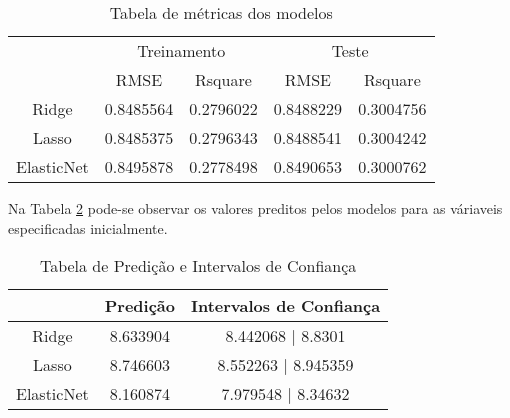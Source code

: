 \begin{table}[H]
\centering
\caption{Tabela de métricas dos modelos}
\begin{tabular}{c|c|c|c|c||}      
\cline{2-5}
    & \multicolumn{2}{c|}{Treinamento} & \multicolumn{2}{c||}{Teste}\\
\cline{2-5}
    & RMSE & Rsquare & RMSE & Rsquare\\
\cline{1-5}
\multicolumn{1}{||c|}{Ridge} & \cellcolor[HTML]{FFF8B8} 0.8485564 & \cellcolor[HTML]{FFF8B8} 0.2796022 & \cellcolor[HTML]{CAF2C2} 0.8488229 & \cellcolor[HTML]{CAF2C2} 0.3004756 \\
\cline{1-5}
\multicolumn{1}{||c|}{Lasso} & \cellcolor[HTML]{CAF2C2} 0.8485375 & \cellcolor[HTML]{CAF2C2} 0.2796343 & \cellcolor[HTML]{FFF8B8} 0.8488541 & \cellcolor[HTML]{FFF8B8} 0.3004242 \\
\cline{1-5}
\multicolumn{1}{||c|}{ElasticNet} & \cellcolor[HTML]{FFD6C9} 0.8495878 & \cellcolor[HTML]{FFD6C9} 0.2778498 & \cellcolor[HTML]{FFD6C9} 0.8490653 & \cellcolor[HTML]{FFD6C9} 0.3000762 \\                
\hline
\end{tabular}
\label{tab:metricas}
\end{table}

Na Tabela \ref{tab:predicao} pode-se observar os valores preditos pelos modelos para as váriaveis especificadas inicialmente.

\begin{table}[H]
\centering
\caption{Tabela de Predição e Intervalos de Confiança}
\begin{tabular}{c|c|c||}       
\cline{2-3}
           & \multicolumn{1}{c|}{Predição} & Intervalos de Confiança \\
\hline
\multicolumn{1}{||c|}{Ridge}      & 8.633904 & 8.442068 | 8.8301     \\
\hline
\multicolumn{1}{||c|}{Lasso}      & 8.746603 & 8.552263 | 8.945359     \\
\hline
\multicolumn{1}{||c|}{ElasticNet} & 8.160874 & 7.979548 | 8.34632    \\
\hline
\end{tabular}
\label{tab:predicao}
\end{table}